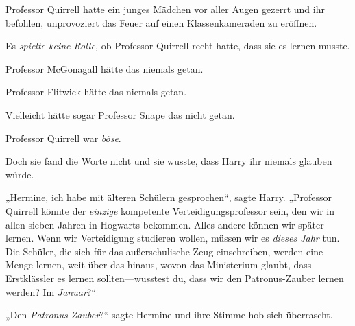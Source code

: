 Professor Quirrell hatte ein junges Mädchen vor aller Augen gezerrt und ihr befohlen, unprovoziert das Feuer auf einen Klassenkameraden zu eröffnen.

Es \emph{spielte keine Rolle,} ob Professor Quirrell recht hatte, dass sie es lernen musste.

Professor McGonagall hätte das niemals getan.

Professor Flitwick hätte das niemals getan.

Vielleicht hätte sogar Professor Snape das nicht getan.

Professor Quirrell war \emph{böse}.

Doch sie fand die Worte nicht und sie wusste, dass Harry ihr niemals glauben würde.

„Hermine, ich habe mit älteren Schülern gesprochen“, sagte Harry. „Professor Quirrell könnte der \emph{einzige} kompetente Verteidigungsprofessor sein, den wir in allen sieben Jahren in Hogwarts bekommen. Alles andere können wir später lernen. Wenn wir Verteidigung studieren wollen, müssen wir es \emph{dieses Jahr} tun. Die Schüler, die sich für das außerschulische Zeug einschreiben, werden eine Menge lernen, weit über das hinaus, wovon das Ministerium glaubt, dass Erstklässler es lernen sollten—wusstest du, dass wir den Patronus-Zauber lernen werden? Im \emph{Januar}?“

„Den \emph{Patronus-Zauber}?“ sagte Hermine und ihre Stimme hob sich überrascht.

